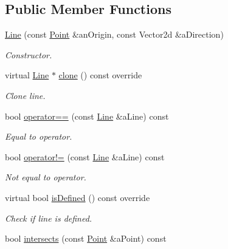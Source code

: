 \subsection*{Public Member Functions}
\begin{DoxyCompactItemize}
\item 
\hyperlink{classostk_1_1math_1_1geom_1_1d2_1_1objects_1_1_line_aa1570ebec4d4f57cbed3c188e6b65613}{Line} (const \hyperlink{classostk_1_1math_1_1geom_1_1d2_1_1objects_1_1_point}{Point} \&an\+Origin, const Vector2d \&a\+Direction)
\begin{DoxyCompactList}\small\item\em Constructor. \end{DoxyCompactList}\item 
virtual \hyperlink{classostk_1_1math_1_1geom_1_1d2_1_1objects_1_1_line}{Line} $\ast$ \hyperlink{classostk_1_1math_1_1geom_1_1d2_1_1objects_1_1_line_a5c81c1f01b0372c7b0f8e597e77dad92}{clone} () const override
\begin{DoxyCompactList}\small\item\em Clone line. \end{DoxyCompactList}\item 
bool \hyperlink{classostk_1_1math_1_1geom_1_1d2_1_1objects_1_1_line_a28431140a19916f4bd81c991b6db0966}{operator==} (const \hyperlink{classostk_1_1math_1_1geom_1_1d2_1_1objects_1_1_line}{Line} \&a\+Line) const
\begin{DoxyCompactList}\small\item\em Equal to operator. \end{DoxyCompactList}\item 
bool \hyperlink{classostk_1_1math_1_1geom_1_1d2_1_1objects_1_1_line_a0e58e32726efa279b8f21f1b1c60cb36}{operator!=} (const \hyperlink{classostk_1_1math_1_1geom_1_1d2_1_1objects_1_1_line}{Line} \&a\+Line) const
\begin{DoxyCompactList}\small\item\em Not equal to operator. \end{DoxyCompactList}\item 
virtual bool \hyperlink{classostk_1_1math_1_1geom_1_1d2_1_1objects_1_1_line_a1e2a44eac16df2d9009eebf3aa85afd2}{is\+Defined} () const override
\begin{DoxyCompactList}\small\item\em Check if line is defined. \end{DoxyCompactList}\item 
bool \hyperlink{classostk_1_1math_1_1geom_1_1d2_1_1objects_1_1_line_abb4e7785e861a1f7362684a3f3d81cb5}{intersects} (const \hyperlink{classostk_1_1math_1_1geom_1_1d2_1_1objects_1_1_point}{Point} \&a\+Point) const

\end{DoxyCompactItemize}
